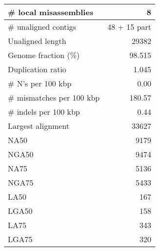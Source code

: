 \documentclass[12pt,a4paper]{article}
\begin{document}
\begin{table}[ht]
\begin{center}
\begin{tabular}{|l*{1}{|r}|}
\# local misassemblies & 8 \\ \hline
\# unaligned contigs & 48 + 15 part \\ \hline
Unaligned length & 29382 \\ \hline
Genome fraction (\%) & 98.515 \\ \hline
Duplication ratio & 1.045 \\ \hline
\# N's per 100 kbp & 0.00 \\ \hline
\# mismatches per 100 kbp & 180.57 \\ \hline
\# indels per 100 kbp & 0.44 \\ \hline
Largest alignment & 33627 \\ \hline
NA50 & 9179 \\ \hline
NGA50 & 9474 \\ \hline
NA75 & 5136 \\ \hline
NGA75 & 5433 \\ \hline
LA50 & 167 \\ \hline
LGA50 & 158 \\ \hline
LA75 & 343 \\ \hline
LGA75 & 320 \\ \hline
\end{tabular}
\end{center}
\end{table}
\end{document}

